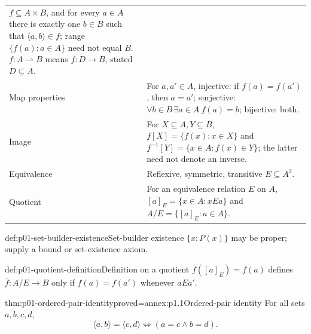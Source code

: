 \begin{longtable}{@{}p{}p{}@{}}
\(f\subseteq A\times B\), and for every \(a\in A\) there is exactly one
\(b\in B\) such that \(\langle a,b\rangle\in f\); range
\(\{f(a):a\in A\}\) need not equal \(B\).
\(f:A\rightharpoonup B\) means \(f:D\to B\), stated \(D\subseteq A\).
\index{partial function} \\
Map properties\index{injection}\index{surjection}\index{bijection} &
For \(a,a'\in A\), injective: if \(f(a)=f(a')\), then \(a=a'\); surjective:
\(\forall b\in B\,\exists a\in A\ f(a)=b\); bijective: both. \\
Image\index{image}\index{inverse image} & For \(X\subseteq A,Y\subseteq B\),
\(f[X]=\{f(x):x\in X\}\) and
\(f^{-1}[Y]=\{x\in A:f(x)\in Y\}\); the latter need not denote an inverse. \\
Equivalence\index{equivalence relation} & Reflexive, symmetric, transitive
\(E\subseteq A^2\). \\
Quotient\index{equivalence class}\index{quotient set} & For an equivalence
relation \(E\) on \(A\), \([a]_E=\{x\in A:xEa\}\) and
\(A/E=\{[a]_E:a\in A\}\). \\
\bottomrule
\end{longtable}
\endgroup

\begin{hbwarning}{def:p01-set-builder-existence}{Set-builder existence}
\(\{x:P(x)\}\) may be proper; supply a bound or set-existence axiom.
\end{hbwarning}
\begin{hbmethod}{def:p01-quotient-definition}{Definition on a quotient}
\(\bar f([a]_E)=f(a)\) defines \(\bar f:A/E\to B\) only if
\(f(a)=f(a')\) whenever \(aEa'\).
\end{hbmethod}
\begin{hblemma}{thm:p01-ordered-pair-identity}{proved=annex:p1.1}{Ordered-pair identity}
For all sets \(a,b,c,d\),
\[
\langle a,b\rangle=\langle c,d\rangle
\iff(a=c\land b=d).
\]
\end{hblemma}
